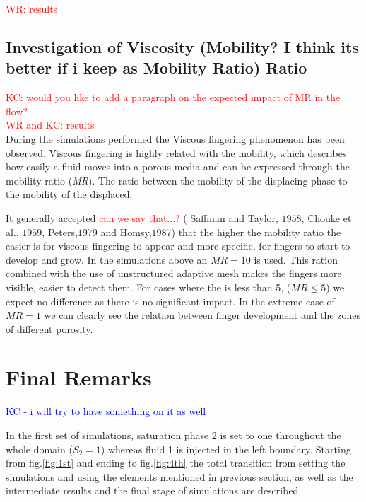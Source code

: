 \documentclass[preprint,authoryear,12pt]{elsarticle}
\begin{document}
\medskip
\textcolor{red}{WR: results }

\subsection{Investigation of Viscosity (Mobility? I think its better if i keep as Mobility Ratio) Ratio}\label{section:MobilityAnalysis}
\textcolor{red}{KC: would you like to add a paragraph on the expected impact of MR in the flow?}\\
\medskip
\textcolor{red}{WR and KC: results}\\

During the simulations performed the Viscous fingering phenomenon has been observed. Viscous fingering  is highly related with the mobility, which describes how easily a fluid moves into a porous media and can be expressed through the mobility ratio (\textit{MR}). The ratio between the mobility of the displacing phase to the mobility of the displaced. 

It generally accepted \textcolor{red}{can we say that...?} ( Saffman and Taylor, $1958$, Chouke et al., $1959$, Peters,$1979$ and Homsy,$1987$) that the higher the mobility ratio the easier is for viscous fingering to appear and more specific, for fingers to start to develop and grow. In the simulations above an $MR=10$ is used. This ration combined with the use of unstructured adaptive mesh makes the fingers more visible, easier to detect them. For cases where the is less than 5, ($MR \le 5$) we expect no difference as there is no significant impact. In the extreme case of $MR=1$ we can clearly see the relation between finger development and the zones of different porosity.      

\pagebreak

\section{Final Remarks}\label{section:conclusions}
\textcolor{blue}{KC - i will try to have something on it as well}

In the first set of simulations, saturation phase 2 is set to one throughout the whole domain ($S_2 = 1$) whereas fluid 1 is injected in the left boundary. Starting from fig.\ref{fig:1st} and ending to fig.\ref{fig:4th} the total transition from setting the simulations and using the elements mentioned in previous section, as well as the intermediate results and the final stage of simulations are described.
\end{document}
